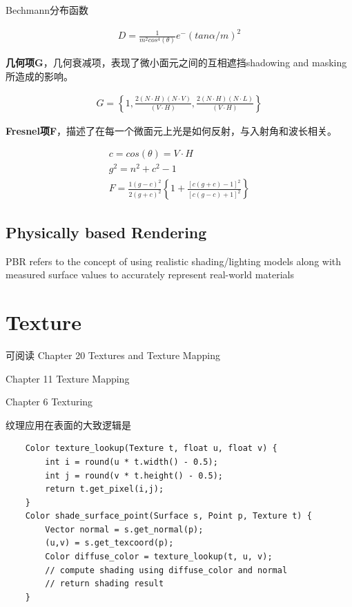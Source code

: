 Bechmann分布函数
\newline

\begin{align*}
    D = \frac{1}{m^2cos^4(\theta)}e^-(tan\alpha / m)^2
\end{align*}

\textbf{几何项G}，几何衰减项，表现了微小面元之间的互相遮挡shadowing and masking所造成的影响。
\newline

\begin{align*}
    G = \left\{
        1, \frac{2(N \cdot H)(N \cdot V)}{(V \cdot H)}, \frac{2(N \cdot H)(N \cdot L)}{(V \cdot H)} 
    \right\}
\end{align*}

\textbf{Fresnel项F}，描述了在每一个微面元上光是如何反射，与入射角和波长相关。
\newline

\begin{align*}
    c = cos(\theta) = V \cdot H \\
    g^2 = n^2 + c^2 - 1 \\
F = \frac{1(g-c)^2}{2(g+c)^2} \left\{ 1+\frac{[c(g+c)-1]^2}{[c(g-c)+1]^2} \right\}
\end{align*}

\section{Physically based Rendering}

PBR refers to the concept of using realistic shading/lighting models along with measured surface values to accurately represent real-world materials

\chapter{Texture}

可阅读
Chapter 20 Textures and Texture Mapping\cite{CGPP3ed}

Chapter 11 Texture Mapping\cite{FCG4ed}

Chapter 6 Texturing\cite{RTR4ed}

纹理应用在表面的大致逻辑是
\begin{lstlisting}
    Color texture_lookup(Texture t, float u, float v) {
        int i = round(u * t.width() - 0.5);
        int j = round(v * t.height() - 0.5);
        return t.get_pixel(i,j);
    }
    Color shade_surface_point(Surface s, Point p, Texture t) {
        Vector normal = s.get_normal(p);
        (u,v) = s.get_texcoord(p);
        Color diffuse_color = texture_lookup(t, u, v);
        // compute shading using diffuse_color and normal 
        // return shading result    
    }
\end{lstlisting}

